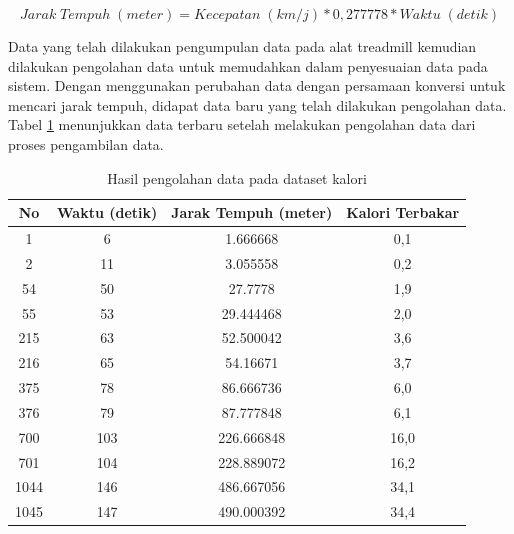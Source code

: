 \begin{equation}
  \label{eq:KonversiJarakTempuh}
  Jarak \; Tempuh \; (meter) = Kecepatan \; (km/j)*0,277778*Waktu \; (detik)
\end{equation}

Data yang telah dilakukan pengumpulan data pada alat treadmill kemudian dilakukan pengolahan data untuk memudahkan dalam penyesuaian data pada sistem. Dengan menggunakan perubahan data dengan persamaan konversi untuk mencari jarak tempuh, didapat data baru yang telah dilakukan pengolahan data. Tabel \ref{tb:OlahDatasetRegresi} menunjukkan data terbaru setelah melakukan pengolahan data dari proses pengambilan data. 

\begin{longtable}{|c|c|c|c|}
  \caption{Hasil pengolahan data pada dataset kalori}
  \label{tb:OlahDatasetRegresi}                                   \\
  \hline
  \rowcolor[HTML]{C0C0C0}
  \textbf{No} & \textbf{Waktu (detik)} & \textbf{Jarak Tempuh (meter)} & \textbf{Kalori Terbakar} \\
  \hline
  1   & 6    & 1.666668    & 0,1     \\
  \hline
  2   & 11    & 3.055558    & 0,2     \\
  \hline
  54   & 50    & 27.7778    & 1,9     \\
  \hline
  55   & 53    & 29.444468    & 2,0     \\
  \hline
  215   & 63    & 52.500042    & 3,6     \\
  \hline
  216   & 65    & 54.16671    & 3,7     \\
  \hline
  375   & 78    & 86.666736    & 6,0     \\
  \hline
  376   & 79    & 87.777848    & 6,1     \\
  \hline
  700   & 103    & 226.666848    & 16,0     \\
  \hline
  701   & 104    & 228.889072    & 16,2     \\
  \hline
  1044   & 146    & 486.667056    & 34,1     \\
  \hline
  1045   & 147    & 490.000392    & 34,4     \\
  \hline
\end{longtable}

